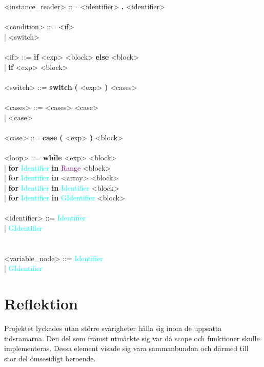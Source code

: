 \documentclass{Dokumentmall}
\begin{document}
\begin{tabbing}
  \><instance\_reader> \>::= \><identifier> \textbf{.} <identifier>\\\\

  \><condition> \>::= \><if>\\
  \> \>| \>  <switch>\\\\

  \><if> \>::= \>\textbf{if}  <exp> <block> \textbf{else} <block>\\
  \> \>| \> \textbf{if} <exp> <block>\\\\

  \><switch> \>::= \>\textbf{switch} \textbf{(} <exp> \textbf{)} <cases>\\\\

  \><cases> \>::= \><cases> <case>\\
  \> \>| \> <case>\\\\

  \><case> \>::= \>\textbf{case} \textbf{(} <exp> \textbf{)} <block>\\\\

  \><loop> \>::= \>\textbf{while} <exp> <block>\\
  \> \>| \> \textbf{for} \textcolor{Cyan}{Identifier} \textbf{in} \textcolor{Purple}{Range} <block>\\
  \> \>| \> \textbf{for} \textcolor{Cyan}{Identifier} \textbf{in} <array> <block>\\
  \> \>| \> \textbf{for} \textcolor{Cyan}{Identifier} \textbf{in} \textcolor{Cyan}{Identifier} <block>\\
  \> \>| \> \textbf{for} \textcolor{Cyan}{Identifier} \textbf{in} \textcolor{Cyan}{GIdentifier} <block>\\\\

  \><identifier> \>::= \>\textcolor{Cyan}{Identifier} \\
  \> \>| \> \textcolor{Cyan}{GIdentifier}\\\\\\

  \><variable\_node> \>::= \>\textcolor{Cyan}{Identifier} \\
  \> \>| \> \textcolor{Cyan}{GIdentifier}\\
\end{tabbing}
\newpage
\section{Reflektion}
Projektet lyckades utan större svårigheter hålla sig inom de uppsatta tidsramarna. Den del som främst utmärkte sig var då scope och funktioner skulle implementeras. Dessa element visade sig vara sammanbundna och därmed till stor del ömsesidigt beroende.\\
\end{document}
